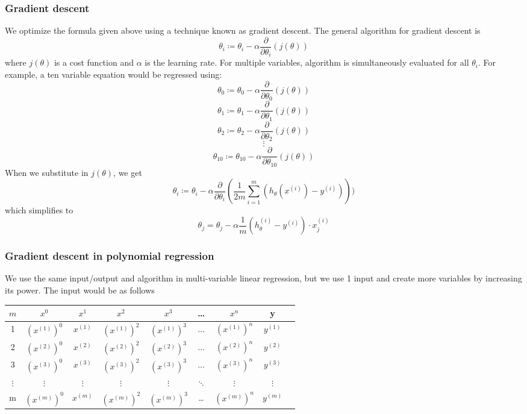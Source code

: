 \subsubsection{Gradient descent}
We optimize the formula given above using a technique known as gradient descent.
The general algorithm for gradient descent is 
$$\theta_i \coloneqq \theta_i - \alpha \frac{\partial}{\partial \theta_i}(j(\theta))$$
where $j(\theta)$ is a cost function and $\alpha$ is the learning rate.
For multiple variables, algorithm is simultaneously evaluated for all $\theta_i$. 
For example, a ten variable equation would be regressed using:
$$\theta_0 \coloneqq \theta_0 - \alpha \frac{\partial}{\partial \theta_0}(j(\theta))$$
$$\theta_1 \coloneqq \theta_1 - \alpha \frac{\partial}{\partial \theta_1}(j(\theta))$$
$$\theta_2 \coloneqq \theta_2 - \alpha \frac{\partial}{\partial \theta_2}(j(\theta))$$
$$\vdots$$
$$\theta_{10} \coloneqq \theta_{10} - \alpha \frac{\partial}{\partial \theta_{10}}(j(\theta))$$
When we substitute in $j(\theta)$, we get
$$\theta_i \coloneqq \theta_{i} - \alpha \frac{\partial}{\partial \theta_i}(\frac{1}{2m} \sum_{i=1}^m (h_{\theta}(x^{(i)}) - y^{(i)})))$$
which simplifies to
$$\theta_j = \theta_j - \alpha \frac{1}{m} (h_{\theta}^{(i)} - y^{(i)}) \cdot x_j^{(i)}$$

\subsubsection{Gradient descent in polynomial regression}
We use the same input/output and algorithm in multi-variable linear regression, but we use 1 input and create more variables by increasing its power. The input would be as follows  
\begin{center}
\begin{tabular}{ |c|c|c|c|c|c|c|c|c| } 
\hline
$m$ & $x^0$ & $x^1$ & $x^2$ & $x^3$ & \dots & $x^n$ & y \\
\hline
1 & $(x^{(1)})^0$ & $x^{(1)}$ & $(x^{(1)})^2$ & $(x^{(1)})^3$ & $\dots$ & $(x^{(1)})^n$ & $y^{(1)}$\\ 
2 & $(x^{(2)})^0$ & $x^{(2)}$ & $(x^{(2)})^2$ & $(x^{(2)})^3$ & $\dots$ & $(x^{(2)})^n$ & $y^{(2)}$\\
3 & $(x^{(3)})^0$ & $x^{(3)}$ & $(x^{(3)})^2$ & $(x^{(3)})^3$ & $\dots$ & $(x^{(3)})^n$ & $y^{(3)}$\\
$\vdots$ & $\vdots$ & $\vdots$ & $\vdots$ & $\vdots$ & $\ddots$ & $\vdots$ & $\vdots$\\ 
m & $(x^{(m)})^0$ & $x^{(m)}$ & $(x^{(m)})^2$ & $(x^{(m)})^3$ & \dots & $(x^{(m)})^n$ & $y^{(m)}$\\ 
\hline
\end{tabular}
\end{center} 


